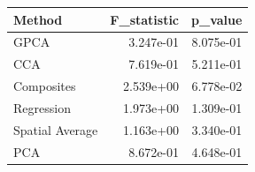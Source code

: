 \begin{tabular}{lrr}
\toprule
Method & F_statistic & p_value \\
\midrule
GPCA & 3.247e-01 & 8.075e-01 \\
CCA & 7.619e-01 & 5.211e-01 \\
Composites & 2.539e+00 & 6.778e-02 \\
Regression & 1.973e+00 & 1.309e-01 \\
Spatial Average & 1.163e+00 & 3.340e-01 \\
PCA & 8.672e-01 & 4.648e-01 \\
\bottomrule
\end{tabular}
